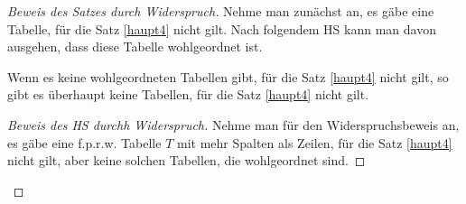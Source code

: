 \begin{proof}[Beweis des Satzes durch Widerspruch]
    Nehme man zunächst an, es gäbe eine Tabelle, für die Satz \ref{haupt4} nicht gilt. Nach folgendem HS kann man 
    davon ausgehen, dass diese Tabelle wohlgeordnet ist.
    \begin{lem}\label{fallbeschrank}
        Wenn es keine wohlgeordneten Tabellen gibt, für die Satz \ref{haupt4} nicht gilt, so gibt es überhaupt keine 
        Tabellen, für die Satz \ref{haupt4} nicht gilt.
    \end{lem}
    \begin{proof}[Beweis des HS durchh Widerspruch]
        Nehme man für den Widerspruchsbeweis an, es gäbe eine f.p.r.w. Tabelle $T$ mit mehr Spalten als Zeilen, für 
        die Satz \ref{haupt4} nicht gilt, aber keine solchen Tabellen, die wohlgeordnet sind. 


\end{proof}
\end{proof}
